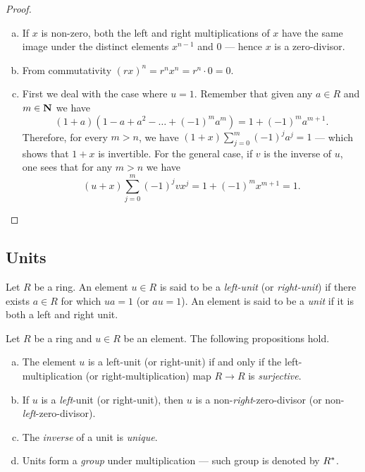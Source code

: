 %
\begin{proof}
\begin{enumerate}[(a)]\setlength\itemsep{0em}
\item If \(x\) is non-zero, both the left and right multiplications of \(x\)
  have the same image under the distinct elements \(x^{n-1}\) and \(0\) ---
  hence \(x\) is a zero-divisor.

\item From commutativity \((r x)^n = r^n x^n = r^n \cdot 0 = 0\).

\item First we deal with the case where \(u = 1\). Remember that given any
  \(a \in R\) and \(m \in \mathbf{N}\) we have
  \[
    (1 + a) (1 - a + a^2 - \dots + (-1)^m a^m) = 1 + (-1)^m a^{m + 1}.
  \]
  Therefore, for every \(m > n\), we have
  \((1 + x) \sum_{j=0}^{m} (-1)^j a^j = 1\) --- which shows that \(1 + x\) is
  invertible. For the general case, if \(v\) is the inverse of \(u\), one sees
  that for any \(m > n\) we have
  \[
    (u + x) \sum_{j=0}^m (-1)^j v x^j = 1 + (-1)^m x^{m + 1} = 1.
  \]
\end{enumerate}
\end{proof}
%

\subsection{Units}

%
\begin{definition}[Unit]
\label{def:unit-element-ring}
Let \(R\) be a ring. An element \(u \in R\) is said to be a \emph{left-unit} (or
\emph{right-unit}) if there exists \(a \in R\) for which \(u a = 1\) (or
\(a u = 1\)). An element is said to be a \emph{unit} if it is both a left and
right unit.
\end{definition}
%

%
\begin{proposition}
\label{prop:unit-properties-ring}
Let \(R\) be a ring and \(u \in R\) be an element. The following propositions
hold.
\begin{enumerate}[(a)]\setlength\itemsep{0em}
\item The element \(u\) is a left-unit (or right-unit) if and only if the
  left-multiplication (or right-multiplication) map \(R \to R\) is
  \emph{surjective}.

\item If \(u\) is a \emph{left}-unit (or right-unit), then \(u\) is a
  non-\emph{right}-zero-divisor (or non-\emph{left}-zero-divisor).

\item The \emph{inverse} of a unit is \emph{unique}.

\item Units form a \emph{group} under multiplication --- such group is denoted
  by \(R^{*}\).
\end{enumerate}
\end{proposition}
%

